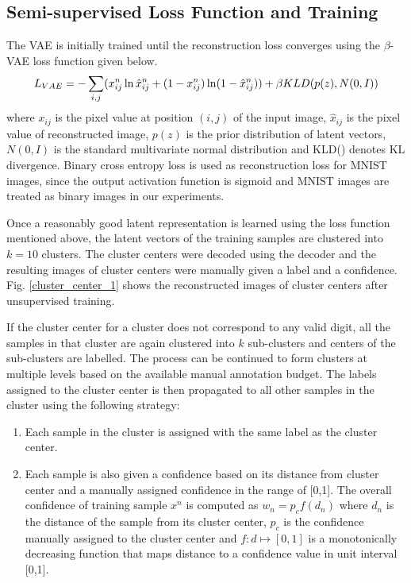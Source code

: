 \documentclass[runningheads]{llncs}
\begin{document}
\subsection{Semi-supervised Loss Function and Training}\label{section_loss_function}
The VAE is initially trained until the reconstruction loss converges using the $\beta$-VAE loss function \cite{beta_vae} given below.
\begin{equation} \label{vae_loss_eqn}
L_{VAE} = -\sum_{i, j}(x_{ij}^n \ln \hat{x}_{ij}^n
+ (1 - x_{ij}^n) \ln(1 -  \hat{x}_{ij}^n ) )\\
    +\beta KLD(p(z), N(0,I))
\end{equation}
where   $x_{ij}$ is the pixel value at position $(i, j)$ of the input image, $\hat{x}_{ij}$ is the pixel value of reconstructed image, $p(z)$ is the prior distribution of latent vectors, $N(0,I)$ is the standard multivariate normal distribution and KLD() denotes KL divergence.
Binary cross entropy loss is used as reconstruction loss for MNIST images, since the output activation function is sigmoid and MNIST images are treated as binary images in our experiments.

Once a reasonably good latent representation is learned using the loss function mentioned above, the latent vectors of the training samples are clustered into $k=10$ clusters.
The cluster centers were decoded using the decoder  and the resulting images of cluster centers were manually given a label and a confidence.
Fig. \ref{cluster_center_1} shows the reconstructed images of cluster centers after unsupervised training.

If the cluster center for a cluster does not correspond to any valid digit, all the samples in that cluster are again clustered into $k$ sub-clusters and  centers of the sub-clusters are labelled.
The process can be continued to form clusters at multiple levels based on the available manual annotation budget.
The labels assigned to the cluster center is then propagated to all other samples in the cluster using the following strategy:
\begin{enumerate}
    \item Each sample in the cluster is assigned with the  same label as the cluster center.
    \item Each sample is also given a confidence based on its distance from cluster center and  a manually assigned confidence in the range of [0,1]. The overall confidence of  training sample $x^n$ is computed as $w_n = p_cf(d_n)$
where $d_n$ is the distance of the sample from its cluster center, $p_c$  is the confidence manually assigned to the cluster center and $f: d \mapsto [0,1]$ is a monotonically decreasing function that maps distance to a confidence value in unit interval [0,1].
\end{enumerate}
\end{document}
